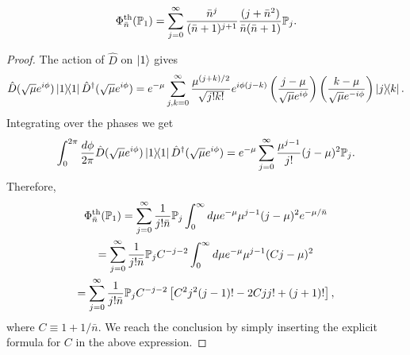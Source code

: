 \documentclass[12pt]{report}
\newcommand{\PP}{\mathbb{P}}
\begin{document}
\begin{prop}\label{prop:thermalisation_applied_to_11}
	\begin{equation}
		\Phi^{\rm th}_{\bar n}(\PP_1)
		= \sum_{j=0}^\infty
			\frac{ \bar n^j }{ (\bar n+1)^{j+1} }
			\frac{ (j+ \bar n^2) }{ \bar n(\bar n + 1) }
			\PP_j.
	\end{equation}
	\label{prop:thermalisation_of_P1}
\end{prop}
\begin{proof}
	The action of $\hat D$ on $\ket1$ gives
	\begin{equation}
		\hat D(\sqrt\mu e^{i\phi})\ketbra1 \hat D^\dagger(\sqrt\mu e^{i\phi})
		= e^{-\mu} \sum_{j,k=0}^\infty \frac{\mu^{(j+k)/2}}{\sqrt{j!k!}} e^{i\phi(j-k)}
		\left(\frac{j-\mu}{\sqrt\mu e^{i\phi}}\right)
		\left(\frac{k-\mu}{\sqrt\mu e^{-i\phi}}\right)
		\ketbra{j}{k}.
	\end{equation}
	Integrating over the phases we get
	\begin{equation}
		\int_0^{2\pi} \frac{d\phi}{2\pi}
		\hat D(\sqrt\mu e^{i\phi})\ketbra1 \hat D^\dagger(\sqrt\mu e^{i\phi})
		= e^{-\mu} \sum_{j=0}^\infty \frac{\mu^{j-1}}{j!} (j-\mu)^2 \PP_j.
	\end{equation}
	Therefore,
	\begin{equation}
	\begin{gathered}
		\Phi_{\bar n}^{\rm th}(\PP_1)
		= \sum_{j=0}^\infty \frac{1}{j!\bar n}\PP_j \int_0^\infty d\mu
		e^{-\mu} \mu^{j-1} (j-\mu)^2 e^{-\mu/\bar n} \\
		= \sum_{j=0}^\infty \frac{1}{j!\bar n}\PP_j
		C^{-j-2} \int_0^\infty d\mu
		e^{-\mu} \mu^{j-1} (C j-\mu)^2 \\
		= \sum_{j=0}^\infty \frac{1}{j!\bar n}\PP_j
		C^{-j-2} \left[
			C^2 j^2 (j-1)! - 2C j j! + (j+1)!
		\right],
	\end{gathered}
	\end{equation}
	where $C\equiv 1+1/\bar n$.
	We reach the conclusion by simply inserting the explicit formula for $C$ in the above expression.
\end{proof}
\end{document}
